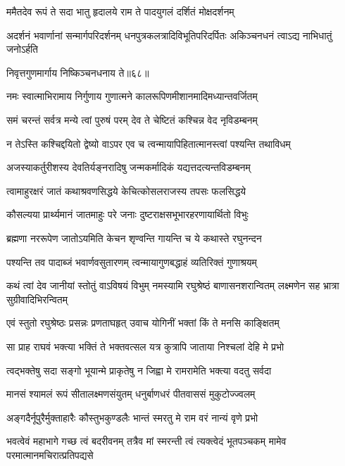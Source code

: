 \twolineshloka
{ममैतदेव रूपं ते सदा भातु हृदालये}
{राम ते पादयुगलं दर्शितं मोक्षदर्शनम्} %

\threelineshloka
{अदर्शनं भवार्णानां सन्मार्गपरिदर्शनम्}
{धनपुत्रकलत्रादिविभूतिपरिदर्पितः}
{अकिञ्चनधनं त्वाऽद्य नाभिधातुं जनोऽर्हति} %

\onelineshloka
{निवृत्तगुणमार्गाय निष्किञ्चनधनाय ते॥६८॥} %

\twolineshloka
{नमः स्वात्माभिरामाय निर्गुणाय गुणात्मने}
{कालरूपिणमीशानमादिमध्यान्तवर्जितम्} %

\twolineshloka
{समं चरन्तं सर्वत्र मन्ये त्वां पुरुषं परम्}
{देव ते चेष्टितं कश्चिन्न वेद नृविडम्बनम्} %

\twolineshloka
{न तेऽस्ति कश्चिद्दयितो द्वेष्यो वाऽपर एव च}
{त्वन्मायापिहितात्मानस्त्वां पश्यन्ति तथाविधम्} %

\twolineshloka
{अजस्याकर्तुरीशस्य देवतिर्यङ्नरादिषु}
{जन्मकर्मादिकं यद्यत्तदत्यन्तविडम्बनम्} %

\twolineshloka
{त्वामाहुरक्षरं जातं कथाश्रवणसिद्धये}
{केचित्कोसलराजस्य तपसः फलसिद्धये} %

\twolineshloka
{कौसल्यया प्रार्थ्यमानं जातमाहुः परे जनाः}
{दुष्टराक्षसभूभारहरणायार्थितो विभुः} %

\twolineshloka
{ब्रह्मणा नररूपेण जातोऽयमिति केचन}
{शृण्वन्ति गायन्ति च ये कथास्ते रघुनन्दन} %

\twolineshloka
{पश्यन्ति तव पादाब्जं भवार्णवसुतारणम्}
{त्वन्मायागुणबद्धाहं व्यतिरिक्तं गुणाश्रयम्} %

\threelineshloka
{कथं त्वां देव जानीयां स्तोतुं वाऽविषयं विभुम्}
{नमस्यामि रघुश्रेष्ठं बाणासनशरान्वितम्}
{लक्ष्मणेन सह भ्रात्रा सुग्रीवादिभिरन्वितम्} %

\twolineshloka
{एवं स्तुतो रघुश्रेष्ठः प्रसन्नः प्रणताघहृत्}
{उवाच योगिनीं भक्तां किं ते मनसि काङ्क्षितम्} %

\twolineshloka
{सा प्राह राघवं भक्त्या भक्तिं ते भक्तवत्सल}
{यत्र कुत्रापि जाताया निश्चलां देहि मे प्रभो} %

\twolineshloka
{त्वद्भक्तेषु सदा सङ्गो भूयान्मे प्राकृतेषु न}
{जिह्वा मे रामरामेति भक्त्या वदतु सर्वदा} %

\twolineshloka
{मानसं श्यामलं रूपं सीतालक्ष्मणसंयुतम्}
{धनुर्बाणधरं पीतवाससं मुकुटोज्ज्वलम्} %

\twolineshloka
{अङ्गदैर्नूपुरैर्मुक्ताहारैः कौस्तुभकुण्डलैः}
{भान्तं स्मरतु मे राम वरं नान्यं वृणे प्रभो} %


\threelineshloka
{भवत्वेवं महाभागे गच्छ त्वं बदरीवनम्}
{तत्रैव मां स्मरन्ती त्वं त्यक्त्वेदं भूतपञ्चकम्}
{मामेव परमात्मानमचिरात्प्रतिपद्यसे} %


